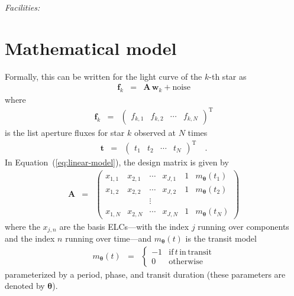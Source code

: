 \documentclass[12pt,preprint]{aastex}
\newcommand{\Eq}[1]{Equation~(\ref{eq:#1})}
\newcommand{\eq}[1]{\Eq{#1}}
\newcommand{\eqlabel}[1]{\label{eq:#1}}
\newcommand{\sectlabel}[1]{\label{sect:#1}}
\newcommand{\T}{\ensuremath{\mathrm{T}}}
\newcommand{\bvec}[1]{{\ensuremath{\boldsymbol{#1}}}}
\begin{document}
{\it Facilities:} 

\appendix

\section{Mathematical model}
\sectlabel{math}

Formally, this can be written for the light curve of the $k$-th star as
\begin{eqnarray}\eqlabel{linear-model}
\bvec{f}_k &=& \bvec{A}\,\bvec{w}_k + \mathrm{noise}
\end{eqnarray}
where
\begin{eqnarray}
\bvec{f}_k &=& \left (\begin{array}{cccc}
    f_{k,1} & f_{k,2} & \cdots & f_{k,N}
\end{array}\right )^\T
\end{eqnarray}
is the list aperture fluxes for star $k$ observed at $N$ times
\begin{eqnarray}
\bvec{t} &=& \left (\begin{array}{cccc}
    t_{1} & t_{2} & \cdots & t_{N}
\end{array}\right )^\T \quad.
\end{eqnarray}
In \eq{linear-model}, the design matrix is given by
\begin{eqnarray}
\bvec{A} &=& \left (\begin{array}{cccccc}
    x_{1,1} & x_{2,1} & \cdots & x_{J,1} & 1 & m_\bvec{\theta}(t_1) \\
    x_{1,2} & x_{2,2} & \cdots & x_{J,2} & 1 & m_\bvec{\theta}(t_2) \\
    && \vdots &&&\\
    x_{1,N} & x_{2,N} & \cdots & x_{J,N} & 1 & m_\bvec{\theta}(t_N)
\end{array}\right )
\end{eqnarray}
where the $x_{j,n}$ are the basis ELCs---with the index $j$ running over
components and the index $n$ running over time---and $m_\bvec{\theta}(t)$ is
the transit model
\begin{eqnarray}
m_\bvec{\theta}(t) &=& \left\{\begin{array}{cl}
-1 & \mathrm{if\,}t\,\mathrm{in\,transit} \\
0 & \mathrm{otherwise}
\end{array}\right.
\end{eqnarray}
parameterized by a period, phase, and transit duration (these parameters are
denoted by \bvec{\theta}).
\end{document}
